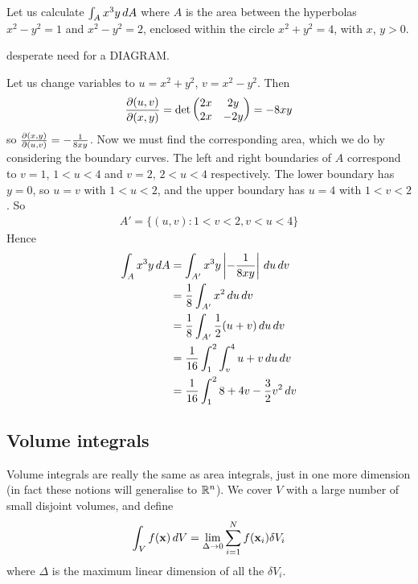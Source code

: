\documentclass{../../template/note}
\begin{document}
    \begin{example*}
        Let us calculate \(\int_A x^3y \,d{A}\) where \(A\) is the area between the hyperbolas \(x^2 - y^2 = 1\) and \(x^2 - y^2 = 2\), enclosed within the circle \(x^2 + y^2 = 4\), with \(x\), \(y > 0\).

        desperate need for a DIAGRAM.

        Let us change variables to \(u = x^2 + y^2\), \(v = x^2 - y^2\). Then
        \begin{align*}
            \pd{(u, v)}{(x, y)} = \det \begin{pmatrix}
             2x & 2y \\
             2x & -2y \\
            \end{pmatrix} = -8xy
        \end{align*}
        so \(\pd{(x, y)}{(u, v)} = -\frac 1 {8xy}\). Now we must find the corresponding area, which we do by considering the boundary curves. The left and right boundaries of \(A\) correspond to \(v = 1\), \(1 < u < 4\) and \(v = 2\), \(2 < u < 4\) respectively. The lower boundary has \(y = 0\), so \(u = v\) with \(1 < u < 2\), and the upper boundary has \(u = 4\) with \(1 < v < 2\). So
        \begin{align*}
            A' = \{(u, v) : 1 < v < 2, v < u < 4\}
        \end{align*}
        Hence
        \begin{align*}
            \int_A x^3 y \,d{A} &= \int_{A'} x^3y \left|-\frac 1 {8xy}\right| \,d{u} \, dv \\
            &= \frac 1 8 \int_{A'} x^2 \,d{u} \, dv \\
            &= \frac 1 8 \int_{A'} \frac 1 2 (u + v) \,d{u} \, dv \\
            &= \frac 1 {16} \int_1^2 \int_v^4 u + v \,d{u} \, dv \\
            &= \frac 1 {16} \int_1^2 8 + 4v - \frac 3 2 v^2 \,d{v}
        \end{align*}
    \end{example*}
    
    \subsection{Volume integrals}

    Volume integrals are really the same as area integrals, just in one more dimension (in fact these notions will generalise to \(\mathbb R^n\)). We cover \(V\) with a large number of small disjoint volumes, and define
    \begin{align*}
        \int_V f(\V x) \D V = \lim_{\Delta \to 0} \sum_{i=1}^N f(\V x_i) \delta V_i
    \end{align*}
    where \(\Delta\) is the maximum linear dimension of all the \(\delta V_i\).
\end{document}
